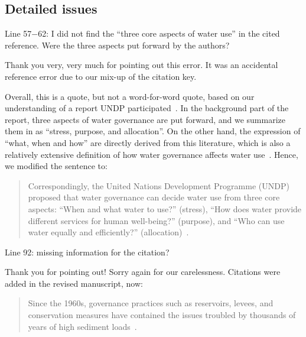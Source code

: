 \subsection{Detailed issues}

\RC{} Line 57$-$62: I did not find the ``three core aspects of water use'' in the cited reference. Were the three aspects put forward by the authors?

\AR Thank you very, very much for pointing out this error. It was an accidental reference error due to our mix-up of the citation key.

\AR*{} Overall, this is a quote, but not a word-for-word quote, based on our understanding of a report UNDP participated~\cite{mariajacobson2013}. In the background part of the report, three aspects of water governance are put forward, and we summarize them in as ``stress, purpose, and allocation''. On the other hand, the expression of ``what, when and how'' are directly derived from this literature, which is also a relatively extensive definition of how water governance affects water use~\cite{lasswell2018,allan2001,mariajacobson2013}. Hence, we modified the sentence to:

\begin{quote}
	Correspondingly, the United Nations Development Programme (UNDP) proposed that water governance can decide water use from three core aspects: ``When and what water to use?'' (stress), ``How does water provide different services for human well-being?'' (purpose), and ``Who can use water equally and efficiently?'' (allocation)~\cite{mariajacobson2013}.
\end{quote}

\RC{} Line 92: missing information for the citation?

\AR{} Thank you for pointing out! Sorry again for our carelessness. Citations were added in the revised manuscript, now:

\begin{quote}
	Since the 1960s, governance practices such as reservoirs, levees, and conservation measures have contained the issues troubled by thousands of years of high sediment loads~\cite{wang2016a,song2020}.
\end{quote}

